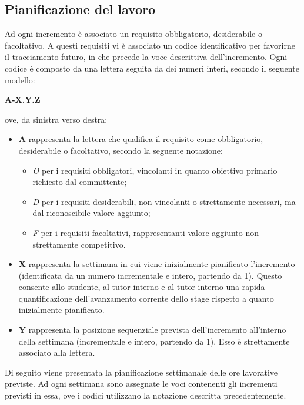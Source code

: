 \subsection{Pianificazione del lavoro}
\label{sec:pianificazione}
Ad ogni incremento è associato un requisito obbligatorio, desiderabile o facoltativo.
A questi requisiti vi è associato un codice identificativo per favorirne il tracciamento futuro, in che precede la voce descrittiva dell'incremento.
\noindent
Ogni codice è composto da una lettera seguita da dei numeri interi, secondo il seguente modello:
\begin{center}
	\textbf{A-X.Y.Z}
\end{center}
ove, da sinistra verso destra:
\begin{itemize}

  \item \textbf{A} rappresenta la lettera che qualifica il requisito come obbligatorio, desiderabile o facoltativo, secondo la seguente notazione:
  \begin{itemize}
  	\item \textit{O} per i requisiti obbligatori, vincolanti in quanto obiettivo primario richiesto dal committente;
  	\item \textit{D} per i requisiti desiderabili, non vincolanti o strettamente necessari,
  		  ma dal riconoscibile valore aggiunto;
  	\item \textit{F} per i requisiti facoltativi, rappresentanti valore aggiunto non strettamente
  		  competitivo.
  \end{itemize}

  \item \textbf{X} rappresenta la settimana in cui viene inizialmente pianificato l'incremento (identificata da un numero incrementale e intero, partendo da 1).
  Questo consente allo studente, al tutor interno e al tutor interno una rapida quantificazione dell'avanzamento corrente dello stage rispetto a quanto inizialmente pianificato.

  \item \textbf{Y} rappresenta la posizione sequenziale prevista dell’incremento all’interno della settimana (incrementale e intero, partendo da 1). Esso è strettamente associato alla lettera.


\end{itemize}
\noindent
Di seguito viene presentata la pianificazione settimanale delle ore lavorative previste.
Ad ogni settimana sono assegnate le voci contenenti gli incrementi previsti in essa, ove i codici utilizzano la notazione descritta precedentemente.

